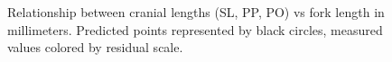 \documentclass[12pt]{article}\usepackage[]{graphicx}\usepackage[]{color}
\begin{document}
\begin{figure}[htb]

 \hfill{}

\caption{Relationship between cranial lengths (SL, PP, PO) vs fork length in millimeters. Predicted points represented by black circles, measured values colored by residual scale.}\label{fig:figure3}
\end{figure}
\clearpage
\end{document}
